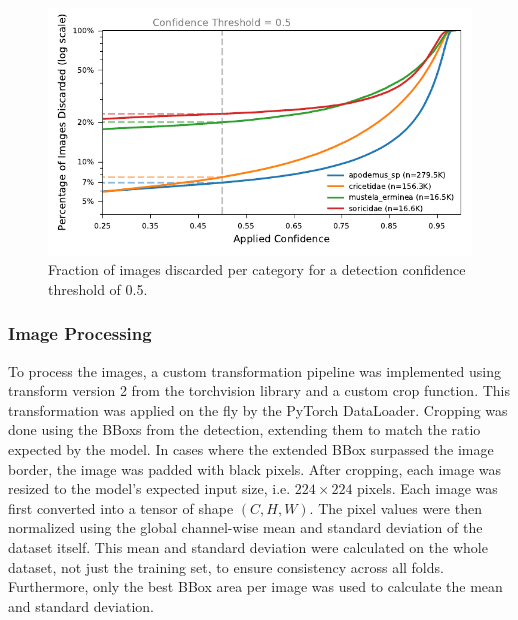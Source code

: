         \begin{figure}[ht]
        \centering
        \includegraphics{figures/discarded_img_by_conf.pdf}
        \caption{Fraction of images discarded per category for a detection confidence threshold of 0.5.}
        \label{fig:lost_images}
        \end{figure}        

        \subsubsection{Image Processing}
        To process the images, a custom transformation pipeline was implemented using transform version 2 from the torchvision library and a custom crop function.
        This transformation was applied on the fly by the PyTorch DataLoader.
        Cropping was done using the \acp{BBox} from the detection, extending them to match the ratio expected by the model.
        In cases where the extended \ac{BBox} surpassed the image border, the image was padded with black pixels.
        After cropping, each image was resized to the model's expected input size, i.e. \(224\times224\) pixels.
        Each image was first converted into a tensor of shape \((C,H,W)\).
        The pixel values were then normalized using the global channel-wise mean and standard deviation of the dataset itself.
        This mean and standard deviation were calculated on the whole dataset, not just the training set, to ensure consistency across all folds.
        Furthermore, only the best \ac{BBox} area per image was used to calculate the mean and standard deviation.



